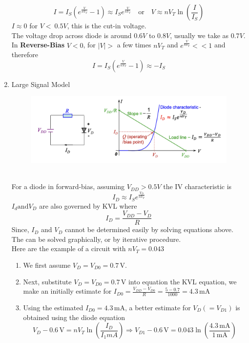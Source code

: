 \documentclass{article}
\begin{document}
\begin{enumerate}
    \[I = I_S(e^{\frac{V}{nV_T}}-1) \approx I_S e^{\frac{V}{nV_T}}\quad \text{or} \quad V\approx nV_T\ln(\frac{I}{I_S})\]
    $I \approx 0$ for $V < ~0.5V$, this is the cut-in voltage.\\
    The voltage drop across diode is around $0.6V$ to $0.8V$, usually we take as $0.7V$.\\
    In \textbf{Reverse-Bias} $V<0$, for $|V|>$ a few times $nV_T$ and $\displaystyle e^{\frac{V}{nV_T}} << 1$ and therefore
    \[I = I_S(e^{\frac{V}{nV_T}}-1) \approx -I_S\]    
    \newpage
    \item Large Signal Model
    \begin{figure}[h]
        \centering
        \includegraphics[width=1\linewidth]{image/largemodel.png}
    \end{figure} \\
    For a diode in forward-bias, assuming $\displaystyle V_{DD}>0.5V$ the IV characteristic is
    \[I_D \approx I_S e^{\frac{V_D}{nV_T}}\]
    $\displaystyle I_d \text{and} V_D$ are also governed by KVL where 
    \[I_D = \frac{V_{DD}-V_D}{R}\]
    Since, $I_D$ and $V_D$ cannot be determined easily by solving equations above. The can be solved graphically, or by iterative procedure. \\
    Here are the example of a circuit with \(nV_T = 0.043\) \\
    \begin{enumerate}
        \item We first assume \( V_D = V_{D0} = 0.7 \, \text{V} \).
        \item Next, substitute \( V_D = V_{D0} = 0.7 \, \text{V} \) into equation the KVL equation, we make an initially estimate for \(I_{D0} = \frac{V_{DD} - V_{D0}}{R} = \frac{5 - 0.7}{1000} = 4.3 \, \text{mA} \)
        \item Using the estimated \( I_{D0} = 4.3 \, \text{mA} \), a better estimate for \( V_D ( = V_{D1} ) \) is obtained using the diode equation
        \[ V_D - 0.6 \, \text{V} = nV_T \ln(\frac{I_D}{I_{1} mA}) \Rightarrow V_{D1} - 0.6 \, \text{V} = 0.043 \ln(\frac{4.3 \, \text{mA}}{1 \, \text{mA}}) \]

\end{enumerate}
\end{enumerate}
\end{document}
